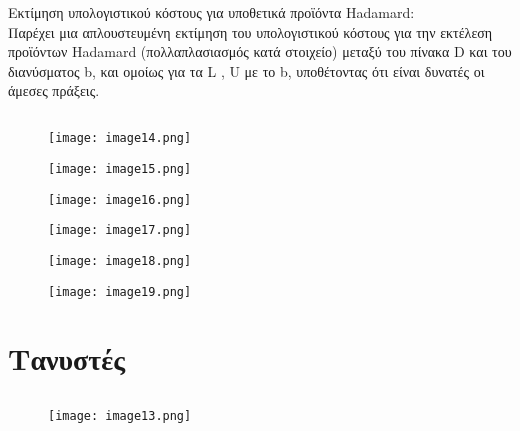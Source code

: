\documentclass[12pt,a4paper]{article}
\begin{document}
Εκτίμηση υπολογιστικού κόστους για υποθετικά προϊόντα Hadamard: \\
Παρέχει μια απλουστευμένη εκτίμηση του υπολογιστικού κόστους για την εκτέλεση προϊόντων Hadamard (πολλαπλασιασμός κατά στοιχείο) μεταξύ του πίνακα 
D και του διανύσματος b, και ομοίως για τα L , U με το b, υποθέτοντας ότι είναι δυνατές οι άμεσες πράξεις.

\subsection{}

\begin{figure}[h]
\centering
\texttt{[image: image14.png]} 
\label{fig:image9}
\end{figure}
\begin{figure}[h]
\centering
\texttt{[image: image15.png]} 
\label{fig:image10}
\end{figure}
\begin{figure}[h]
\centering
\texttt{[image: image16.png]} 
\label{fig:image11}
\end{figure}
\begin{figure}[h]
\centering
\texttt{[image: image17.png]} 
\label{fig:image12}
\end{figure}
\begin{figure}[h]
\centering
\texttt{[image: image18.png]} 
\label{fig:image13}
\end{figure}
\begin{figure}[h]
\centering
\texttt{[image: image19.png]} 
\label{fig:image20}
\end{figure}
\FloatBarrier %

\section{Τανυστές}
\subsection{}
\begin{figure}[h]
\centering
\texttt{[image: image13.png]} 
\label{fig:image14}
\end{figure}
\FloatBarrier %
\end{document}
